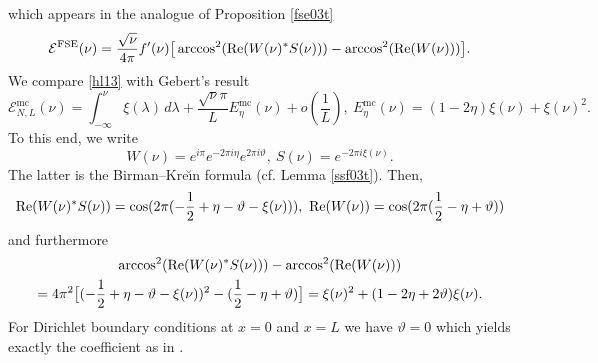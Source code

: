 which appears in the analogue of Proposition \ref{fse03t}
\begin{equation}\label{hl13}
   \mathcal{E}^{\text{FSE}}(\nu) = \frac{\sqrt{\nu}}{4\pi}f'(\nu)
     \big[ \arccos^2(\operatorname{Re}(W(\nu)^*S(\nu))) - \arccos^2(\operatorname{Re}(W(\nu))) \big] .
\end{equation}
We compare \eqref{hl13} with Gebert's result \cite[(1.4), (2.12)]{Gebert2015}
\begin{equation*}
  \mathcal{E}^\text{mc}_{N,L}(\nu)
    = \int_{-\infty}^\nu \xi(\lambda)\, d\lambda 
      + \frac{\sqrt{\nu}\pi}{L} E^\text{mc}_\eta(\nu) + o(\frac{1}{L}),\ 
     E^\text{mc}_\eta(\nu) = (1-2\eta)\xi(\nu) + \xi(\nu)^2 .
\end{equation*} 
To this end, we write
\begin{equation*}
  W(\nu) = e^{i\pi} e^{-2\pi i\eta}  e^{2\pi i\vartheta} ,\ S(\nu) = e^{-2\pi i\xi(\nu)} .
\end{equation*}
The latter is the Birman--Kre\u\i{}n formula (cf. Lemma \ref{ssf03t}). Then,
\begin{equation*}
  \operatorname{Re}(W(\nu)^*S(\nu)) = \cos(2\pi( -\frac{1}{2} + \eta  - \vartheta - \xi(\nu) )),\
  \operatorname{Re}(W(\nu)) = \cos(2\pi( \frac{1}{2} - \eta  + \vartheta))
\end{equation*}
and furthermore
\begin{multline*}
  \arccos^2(\operatorname{Re}(W(\nu)^*S(\nu))) - \arccos^2(\operatorname{Re}(W(\nu)) ) \\
    = 4\pi^2 \big[ ( -\frac{1}{2} + \eta  - \vartheta - \xi(\nu) )^2 - (\frac{1}{2} - \eta + \vartheta) \big] 
    = \xi(\nu)^2 + (1-2\eta+2\vartheta) \xi(\nu) .
\end{multline*}
For Dirichlet boundary conditions at $x=0$ and $x=L$ we have $\vartheta=0$ which yields exactly the coefficient
as in \cite{Gebert2015}.
